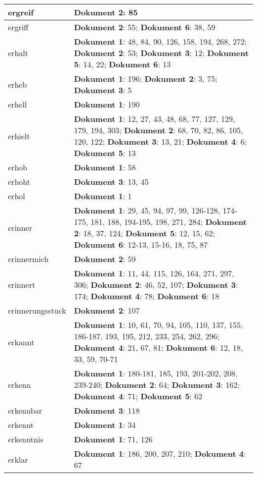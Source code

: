 \documentclass[a5paper]{article}
\begin{document}
\begin{longtable}[l]{|l|p{3in}|}
\hline
ergreif & \textbf{Dokument 2}: 85 \\
\hline
ergriff & \textbf{Dokument 2}: 55; \textbf{Dokument 6}: 38, 59 \\
\hline
erhalt & \textbf{Dokument 1}: 48, 84, 90, 126, 158, 194, 268, 272; \textbf{Dokument 2}: 53; \textbf{Dokument 3}: 12; \textbf{Dokument 5}: 14, 22; \textbf{Dokument 6}: 13 \\
\hline
erheb & \textbf{Dokument 1}: 196; \textbf{Dokument 2}: 3, 75; \textbf{Dokument 3}: 5 \\
\hline
erhell & \textbf{Dokument 1}: 190 \\
\hline
erhielt & \textbf{Dokument 1}: 12, 27, 43, 48, 68, 77, 127, 129, 179, 194, 303; \textbf{Dokument 2}: 68, 70, 82, 86, 105, 120, 122; \textbf{Dokument 3}: 13, 21; \textbf{Dokument 4}: 6; \textbf{Dokument 5}: 13 \\
\hline
erhob & \textbf{Dokument 1}: 58 \\
\hline
erhoht & \textbf{Dokument 3}: 13, 45 \\
\hline
erhol & \textbf{Dokument 1}: 1 \\
\hline
erinner & \textbf{Dokument 1}: 29, 45, 94, 97, 99, 126-128, 174-175, 181, 188, 194-195, 198, 271, 284; \textbf{Dokument 2}: 18, 37, 124; \textbf{Dokument 5}: 12, 15, 62; \textbf{Dokument 6}: 12-13, 15-16, 18, 75, 87 \\
\hline
erinnermich & \textbf{Dokument 2}: 59 \\
\hline
erinnert & \textbf{Dokument 1}: 11, 44, 115, 126, 164, 271, 297, 306; \textbf{Dokument 2}: 46, 52, 107; \textbf{Dokument 3}: 174; \textbf{Dokument 4}: 78; \textbf{Dokument 6}: 18 \\
\hline
erinnerungsstuck & \textbf{Dokument 2}: 107 \\
\hline
erkannt & \textbf{Dokument 1}: 10, 61, 70, 94, 105, 110, 137, 155, 186-187, 193, 195, 212, 233, 254, 262, 296; \textbf{Dokument 4}: 21, 67, 81; \textbf{Dokument 6}: 12, 18, 33, 59, 70-71 \\
\hline
erkenn & \textbf{Dokument 1}: 180-181, 185, 193, 201-202, 208, 239-240; \textbf{Dokument 2}: 64; \textbf{Dokument 3}: 162; \textbf{Dokument 4}: 71; \textbf{Dokument 5}: 62 \\
\hline
erkennbar & \textbf{Dokument 3}: 118 \\
\hline
erkennt & \textbf{Dokument 1}: 34 \\
\hline
erkenntnis & \textbf{Dokument 1}: 71, 126 \\
\hline
erklar & \textbf{Dokument 1}: 186, 200, 207, 210; \textbf{Dokument 4}: 67 \\

\end{longtable}
\end{document}

